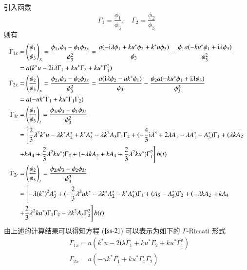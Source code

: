 引入函数
\begin{equation}
  \Gamma_{1} = \frac{\phi_{1}}{\phi_{3}}, \quad \Gamma_{2} = \frac{\phi_{2}}{\phi_{3}}
\end{equation}
则有
\begin{align}
 \Gamma_{1x} &= \left(\frac{\phi_1}{\phi_3}\right)_x=\frac{\phi_{1x}\phi_3-\phi_1\phi_{3x}}{\phi_3^2}=\frac{a(-\mathrm{i}\lambda\phi_1+ku^*\phi_2+k^*u\phi_3)}{\phi_3}-\frac{\phi_1a(-ku^*\phi_1+\mathrm{i}\lambda\phi_3)}{\phi_3^2} \nonumber\\
  &= a(k^{*}u - 2\mathrm{i}\lambda \Gamma_{1} + ku^{*}\Gamma_{2} + ku^{*}\Gamma_{1}^{2}) \\
  \Gamma_{2x} &=\left(\frac{\phi_2}{\phi_3}\right)_x=\frac{\phi_{2x}\phi_3-\phi_2\phi_{3x}}{\phi_3^2}=\frac{a(\mathrm{i}\lambda\phi_2-uk^*\phi_1)}{\phi_3}-\frac{\phi_2a(-ku^*\phi_1+\mathrm{i}\lambda\phi_3)}{\phi_3^2}\nonumber\\
  &= a(-uk^{*}\Gamma_{1} + ku^{*}\Gamma_{1}\Gamma_{2}) \\
  \Gamma_{1t} &= \left(\frac{\phi_1}{\phi_3}\right)_t=\frac{\phi_{1t}\phi_3-\phi_1\phi_{3t}}{\phi_3^2} \notag \\
  &= \left[\frac{2}{3}\lambda^{2}k^{*}u - \lambda k^{*}A_{2}^{*} + k^{*}A_{4}^{*} - \lambda k^{2}A_{3}\Gamma_{1}\Gamma_{2} + (-\frac{4}{3}\mathrm{i}\lambda^{3} + 2\lambda A_{1} - \lambda A_{1}^{*} - A_{5}^{*})\Gamma_{1} + (\lambda kA_{2} \right. \notag\\
  & \left. + kA_{4} + \frac{2}{3}\lambda^{2}ku^{*})\Gamma_{2} + (-\lambda kA_{2} + kA_{4} + \frac{2}{3}\lambda^{2}ku^{*})\Gamma_{1}^{2}\right] b(t) \label{ss-gt1}\\
  \Gamma_{2t} &=\left(\frac{\phi_2}{\phi_3}\right)_t=\frac{\phi_{2t}\phi_3-\phi_2\phi_{3t}}{\phi_3^2} \notag \\
  &= \left[ -\lambda(k^{*})^{2}A_{3}^{*} + (-\frac{2}{3}\lambda^{2}uk^{*} - \lambda k^{*}A_{2}^{*} - k^{*}A_{4}^{*})\Gamma_{1} + (A_{5}-A_{5}^{*})\Gamma_{2} + (-\lambda kA_{2} +kA_{4} \right. \notag\\
  & \left. + \frac{2}{3}\lambda^{2}ku^{*})\Gamma_{1}\Gamma_{2} - \lambda k^{2}A_{3}\Gamma_{2}^{2} \right] b(t) \label{ss-gt2}
\end{align}
由上述的计算结果可以得知方程 ($\ref{ss-2}$) 可以表示为如下的 $\Gamma$-Riccati 形式
\begin{align}
  & \Gamma_{1x} = a(k^{*}u - 2\mathrm{i}\lambda \Gamma_{1} + ku^{*}\Gamma_{2} + ku^{*}\Gamma_{1}^{2}) \label{ss-4} \\
  & \Gamma_{2x} = a(-uk^{*}\Gamma_{1} + ku^{*}\Gamma_{1}\Gamma_{2}) \label{ss-5}
\end{align}
